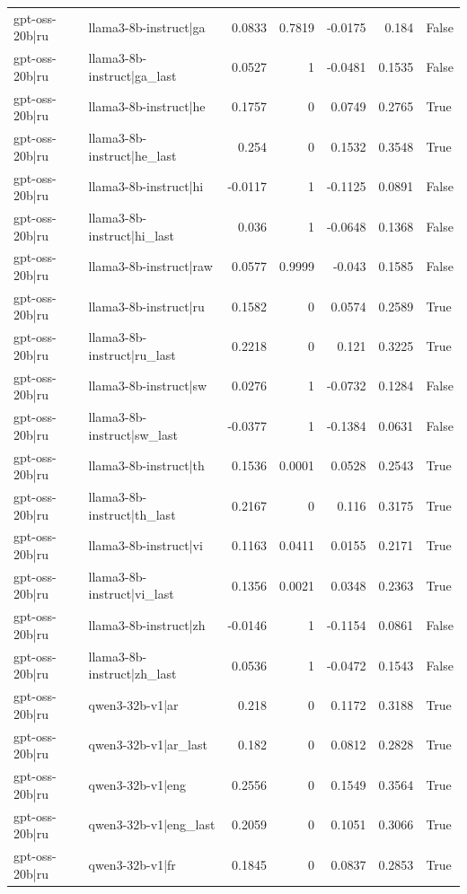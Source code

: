 \begin{table}
\begin{tabular}{l l r r r r l}
gpt-oss-20b|ru & llama3-8b-instruct|ga & 0.0833 & 0.7819 & -0.0175 & 0.184 & False \\
gpt-oss-20b|ru & llama3-8b-instruct|ga_last & 0.0527 & 1 & -0.0481 & 0.1535 & False \\
gpt-oss-20b|ru & llama3-8b-instruct|he & 0.1757 & 0 & 0.0749 & 0.2765 & True \\
gpt-oss-20b|ru & llama3-8b-instruct|he_last & 0.254 & 0 & 0.1532 & 0.3548 & True \\
gpt-oss-20b|ru & llama3-8b-instruct|hi & -0.0117 & 1 & -0.1125 & 0.0891 & False \\
gpt-oss-20b|ru & llama3-8b-instruct|hi_last & 0.036 & 1 & -0.0648 & 0.1368 & False \\
gpt-oss-20b|ru & llama3-8b-instruct|raw & 0.0577 & 0.9999 & -0.043 & 0.1585 & False \\
gpt-oss-20b|ru & llama3-8b-instruct|ru & 0.1582 & 0 & 0.0574 & 0.2589 & True \\
gpt-oss-20b|ru & llama3-8b-instruct|ru_last & 0.2218 & 0 & 0.121 & 0.3225 & True \\
gpt-oss-20b|ru & llama3-8b-instruct|sw & 0.0276 & 1 & -0.0732 & 0.1284 & False \\
gpt-oss-20b|ru & llama3-8b-instruct|sw_last & -0.0377 & 1 & -0.1384 & 0.0631 & False \\
gpt-oss-20b|ru & llama3-8b-instruct|th & 0.1536 & 0.0001 & 0.0528 & 0.2543 & True \\
gpt-oss-20b|ru & llama3-8b-instruct|th_last & 0.2167 & 0 & 0.116 & 0.3175 & True \\
gpt-oss-20b|ru & llama3-8b-instruct|vi & 0.1163 & 0.0411 & 0.0155 & 0.2171 & True \\
gpt-oss-20b|ru & llama3-8b-instruct|vi_last & 0.1356 & 0.0021 & 0.0348 & 0.2363 & True \\
gpt-oss-20b|ru & llama3-8b-instruct|zh & -0.0146 & 1 & -0.1154 & 0.0861 & False \\
gpt-oss-20b|ru & llama3-8b-instruct|zh_last & 0.0536 & 1 & -0.0472 & 0.1543 & False \\
gpt-oss-20b|ru & qwen3-32b-v1|ar & 0.218 & 0 & 0.1172 & 0.3188 & True \\
gpt-oss-20b|ru & qwen3-32b-v1|ar_last & 0.182 & 0 & 0.0812 & 0.2828 & True \\
gpt-oss-20b|ru & qwen3-32b-v1|eng & 0.2556 & 0 & 0.1549 & 0.3564 & True \\
gpt-oss-20b|ru & qwen3-32b-v1|eng_last & 0.2059 & 0 & 0.1051 & 0.3066 & True \\
gpt-oss-20b|ru & qwen3-32b-v1|fr & 0.1845 & 0 & 0.0837 & 0.2853 & True \\

\end{tabular}
\end{table}

